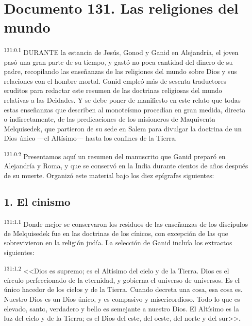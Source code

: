 \chapter{Documento 131. Las religiones del mundo}
\par 
\textsuperscript{131:0.1} DURANTE la estancia de Jesús, Gonod y Ganid en Alejandría, el joven pasó una gran parte de su tiempo, y gastó no poca cantidad del dinero de su padre, recopilando las enseñanzas de las religiones del mundo sobre Dios y sus relaciones con el hombre mortal. Ganid empleó más de sesenta traductores eruditos para redactar este resumen de las doctrinas religiosas del mundo relativas a las Deidades. Y se debe poner de manifiesto en este relato que todas estas enseñanzas que describen al monoteísmo procedían en gran medida, directa o indirectamente, de las predicaciones de los misioneros de Maquiventa Melquisedek, que partieron de su sede en Salem para divulgar la doctrina de un Dios único ---el Altísimo--- hasta los confines de la Tierra.

\par 
\textsuperscript{131:0.2} Presentamos aquí un resumen del manuscrito que Ganid preparó en Alejandría y Roma, y que se conservó en la India durante cientos de años después de su muerte. Organizó este material bajo los diez epígrafes siguientes:

\section*{1. El cinismo}
\par 
\textsuperscript{131:1.1} Donde mejor se conservaron los residuos de las enseñanzas de los discípulos de Melquisedek fue en las doctrinas de los cínicos, con excepción de las que sobrevivieron en la religión judía. La selección de Ganid incluía los extractos siguientes:

\par 
\textsuperscript{131:1.2} <<Dios es supremo; es el Altísimo del cielo y de la Tierra. Dios es el círculo perfeccionado de la eternidad, y gobierna el universo de universos. Es el único hacedor de los cielos y de la Tierra. Cuando decreta una cosa, esa cosa es. Nuestro Dios es un Dios único, y es compasivo y misericordioso. Todo lo que es elevado, santo, verdadero y bello es semejante a nuestro Dios. El Altísimo es la luz del cielo y de la Tierra; es el Dios del este, del oeste, del norte y del sur>>.

